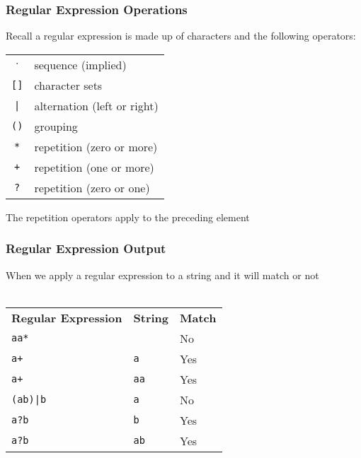 \documentclass[aspectratio=169]{beamer}
\begin{document}
\begin{frame}
\frametitle{Regular Expression Operations}

Recall a \alert{regular expression} is made up of characters and the following
operators:

\begin{center}
\begin{tabular}{cl}
$\cdot$        & sequence (implied)\\
\lstinline{[]} & character sets\\
\lstinline{|}  & alternation (left or right)\\
\lstinline{()} & grouping\\
\lstinline{*}  & repetition (zero or more)\\
\lstinline{+}  & repetition (one or more)\\
\lstinline{?}  & repetition (zero or one)\\
\end{tabular}
\end{center}

The repetition operators apply to the preceding element
\end{frame}

\begin{frame}
\frametitle{Regular Expression Output}

When we apply a \alert{regular expression} to a string and it will match or
not\\~\\

\begin{center}
\begin{tabular}{lll}
\bfseries Regular Expression & \bfseries String &  \bfseries Match\\
\lstinline{aa*}    &                & No\\
\lstinline{a+}     & \lstinline{a}  & Yes\\
\lstinline{a+}     & \lstinline{aa} & Yes\\
\lstinline{(ab)|b} & \lstinline{a}  & No\\
\lstinline{a?b}    & \lstinline{b}  & Yes\\
\lstinline{a?b}    & \lstinline{ab} & Yes\\
\end{tabular}
\end{center}
\end{frame}
\end{document}
